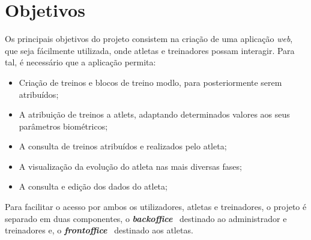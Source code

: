 \section{Objetivos}

Os principais objetivos do projeto consistem na criação de uma aplicação \textit{web}, que seja fácilmente utilizada, onde atletas e treinadores possam interagir. Para tal, é necessário que a aplicação permita:

\begin{itemize}
	\item Criação de treinos e blocos de treino modlo, para posteriormente serem atribuídos;
	\item A atribuição de treinos a atlets, adaptando determinados valores aos seus parâmetros biométricos;
	\item A consulta de treinos atribuídos e realizados pelo atleta;
	\item A visualização da evolução do atleta nas mais diversas fases;
	\item A consulta e edição dos dados do atleta;
\end{itemize}

Para facilitar o acesso por ambos os utilizadores, atletas e treinadores, o projeto é separado em duas componentes, o \textit{\textbf{backoffice}} \textemdash~destinado ao administrador e treinadores e, o \textbf{\textit{frontoffice}} \textemdash~destinado aos atletas.
